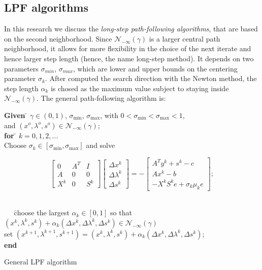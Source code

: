 \documentclass[a4paper,10 pt,titlepage,twoside]{book}
\theoremstyle{plain}
\theoremstyle{definition}
\theoremstyle{remark}
\begin{document}
\subsection{LPF algorithms}
In this research we discuss the \textit{long-step path-following algorithms}, that are based on the second neighborhood. Since  $\mathcal{N}_{-\infty}(\gamma)$ is a larger central path neighborhood, it allows for more flexibility in the choice of the next iterate and hence larger  step length (hence, the name long-step method). It depends on two parameters $\sigma_{min}$, $\sigma_{max}$, which are lower and upper bounds on the centering parameter $\sigma_{k}$. After computed the search direction with the Newton method, the step length $\alpha_{k}$ is chosed as the maximum value subject to staying inside $\mathcal{N}_{-\infty}(\gamma)$.
The general path-following algorithm is:
\begin{algorithm}[H]
	\begin{tabbing}
		\textbf{Given  }\= $\gamma\in(0,1)$, $\sigma_{\text{min}}$, $\sigma_{\text{max}}$, with $0<\sigma_{\text{min}}< \sigma_{\text{max}}<1$,\\
		\> and $(x^{o}, \lambda^{o}, s^{o})\in\mathcal{N}_{-\infty}(\gamma)$;\\
		\textbf{for} \= $k = 0, 1, 2,...$ \\
		\> Choose $\sigma_{k}\in[\sigma_{\text{min}},\sigma_{\text{max}}]$ and solve
	\end{tabbing}
	\begin{equation}\label{P}
	\begin{bmatrix}\label{P}
	0&A^{T}&I \\A&0&0\\X^{k}&0&S^{k}
	\end{bmatrix}\begin{bmatrix}
	\Delta x^{k}\\\Delta\lambda^{k} \\\Delta s^{k}
	\end{bmatrix}=-\begin{bmatrix}
	A^{T}y^{k}+s^{k}-c\\Ax^{k}-b\\-X^{k}S^{k}e + \sigma_{k}\mu_{k}e
	\end{bmatrix};
	\end{equation}
	\begin{tabbing}
		\\
		$\;\;\;\;\;$\=choose the largest $\alpha_{k}\in[0,1]$ so that $(x^{k}, \lambda^{k}, s^{k})+ \alpha_{k}(\Delta x^{k}, \Delta\lambda^{k}, \Delta s^{k})\in\mathcal{N}_{-\infty}(\gamma)$ \\
		\>set $(x^{k+1}, \lambda^{k+1}, s^{k+1}) = (x^{k}, \lambda^{k}, s^{k})+ \alpha_{k}(\Delta x^{k}, \Delta\lambda^{k}, \Delta s^{k})$;\\
		
		\textbf{end}
	\end{tabbing}
	\caption{General LPF algorithm}
\end{algorithm}
\end{document}
